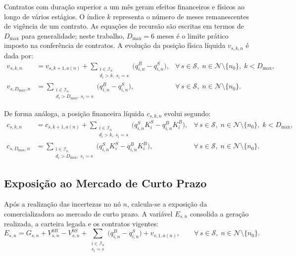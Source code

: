 Contratos com dura\c{c}\~ao superior a um m\^es geram efeitos financeiros e f\'isicos ao longo de v\'arios est\'agios. O \'indice $k$ representa o n\'umero de meses remanescentes de vig\^encia de um contrato. As equa\c{c}\~oes de recurs\~ao s\~ao escritas em termos de $D_{\max}$ para generalidade; neste trabalho, $D_{\max} = 6$ meses \'e o limite pr\'atico imposto na confer\^encia de contratos. A evolu\c{c}\~ao da posi\c{c}\~ao f\'isica l\'iquida $v_{s,k,n}$ \'e dada por:
%
\begin{align}
  v_{s,k,n} &= v_{s,k+1,a(n)} + \sum_{\substack{i \in \mathcal{I}_n \\ d_i > k,\; s_i = s}}
  \!\bigl(q^B_{i,n} - q^S_{i,n}\bigr),
  &\forall\, s \in \mathcal{S},\; n \in \mathcal{N} \setminus \{n_0\},\; k < D_{\max},
  \label{eq:volume_fisico} \\[4pt]
  v_{s,D_{\max},n} &= \sum_{\substack{i \in \mathcal{I}_n \\ d_i > D_{\max},\; s_i = s}}
  \!\bigl(q^B_{i,n} - q^S_{i,n}\bigr),
  &\forall\, s \in \mathcal{S},\; n \in \mathcal{N} \setminus \{n_0\}.
  \label{eq:volume_fisico_max}
\end{align}

De forma an\'aloga, a posi\c{c}\~ao financeira l\'iquida $c_{s,k,n}$ evolui segundo:
%
\begin{align}
  c_{s,k,n} &= c_{s,k+1,a(n)} + \sum_{\substack{i \in \mathcal{I}_n \\ d_i > k,\; s_i = s}}
  \!\bigl(q^S_{i,n} K^S_i - q^B_{i,n} K^B_i\bigr),
  &\forall\, s \in \mathcal{S},\; n \in \mathcal{N} \setminus \{n_0\},\; k < D_{\max},
  \label{eq:posicao_financeira} \\[4pt]
  c_{s,D_{\max},n} &= \sum_{\substack{i \in \mathcal{I}_n \\ d_i > D_{\max},\; s_i = s}}
  \!\bigl(q^S_{i,n} K^S_i - q^B_{i,n} K^B_i\bigr),
  &\forall\, s \in \mathcal{S},\; n \in \mathcal{N} \setminus \{n_0\}.
  \label{eq:posicao_financeira_max}
\end{align}

\subsection{Exposi\c{c}\~ao ao Mercado de Curto Prazo}
\label{subsec:exposicao}

Ap\'os a realiza\c{c}\~ao das incertezas no n\'o $n$, calcula-se a exposi\c{c}\~ao da comercializadora ao mercado de curto prazo. A vari\'avel $E_{s,n}$ consolida a gera\c{c}\~ao realizada, a carteira legada e os contratos vigentes:
%
\begin{equation}
  E_{s,n} = G_{s,n} + V^{0B}_{s,n} - V^{0S}_{s,n}
  + \sum_{\substack{i \in \mathcal{I}_n \\ s_i = s}} \!\bigl(q^B_{i,n} - q^S_{i,n}\bigr)
  + v_{s,1,a(n)},
  \qquad \forall\, s \in \mathcal{S},\; n \in \mathcal{N} \setminus \{n_0\}.
  \label{eq:exposicao}
\end{equation}

